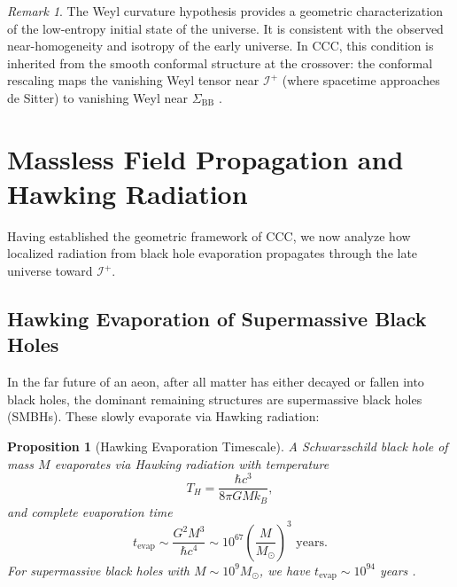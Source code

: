 \documentclass[11pt,a4paper]{article}
\theoremstyle{plain}
\newtheorem{proposition}[theorem]{Proposition}
\theoremstyle{definition}
\theoremstyle{remark}
\newtheorem{remark}[theorem]{Remark}
\newcommand{\scriplus}{\mathcal{I}^+}
\newcommand{\sigmabb}{\Sigma_{\mathrm{BB}}}
\begin{document}
\begin{remark}
The Weyl curvature hypothesis provides a geometric characterization of the low-entropy initial state of the universe. It is consistent with the observed near-homogeneity and isotropy of the early universe. In CCC, this condition is inherited from the smooth conformal structure at the crossover: the conformal rescaling maps the vanishing Weyl tensor near $\scriplus$ (where spacetime approaches de Sitter) to vanishing Weyl near $\sigmabb$ \cite{penrose_weyl,ccc_wiki}.
\end{remark}

\section{Massless Field Propagation and Hawking Radiation}\label{sec:massless_propagation}

Having established the geometric framework of CCC, we now analyze how localized radiation from black hole evaporation propagates through the late universe toward $\scriplus$.

\subsection{Hawking Evaporation of Supermassive Black Holes}

In the far future of an aeon, after all matter has either decayed or fallen into black holes, the dominant remaining structures are supermassive black holes (SMBHs). These slowly evaporate via Hawking radiation:

\begin{proposition}[Hawking Evaporation Timescale]\label{prop:hawking_time}
A Schwarzschild black hole of mass $M$ evaporates via Hawking radiation with temperature
\begin{equation}\label{eq:hawking_temp}
    T_H = \frac{\hbar c^3}{8\pi G M k_B},
\end{equation}
and complete evaporation time
\begin{equation}\label{eq:evap_time}
    t_{\text{evap}} \sim \frac{G^2 M^3}{\hbar c^4} \sim 10^{67} \left( \frac{M}{M_\odot} \right)^3 \text{ years}.
\end{equation}
For supermassive black holes with $M \sim 10^9 M_\odot$, we have $t_{\text{evap}} \sim 10^{94}$ years \cite{hawking_radiation}.
\end{proposition}
\end{document}
